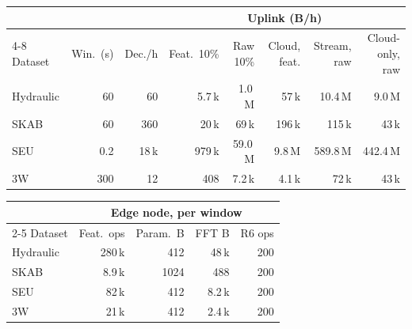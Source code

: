 \begin{tabular}{@{}l rr rrrrr@{}}
\toprule
& & & \multicolumn{5}{c}{Uplink (B/h)} \\
\cmidrule(l){4-8}
Dataset & Win.\ (s) & Dec./h & Feat.\ 10\% & Raw 10\% & Cloud, feat. & Stream, raw & Cloud-only, raw \\
\midrule
Hydraulic & 60 & 60 & 5.7\,k & 1.0\,M & 57\,k & 10.4\,M & 9.0\,M \\
SKAB & 60 & 360 & 20\,k & 69\,k & 196\,k & 115\,k & 43\,k \\
SEU & 0.2 & 18\,k & 979\,k & 59.0\,M & 9.8\,M & 589.8\,M & 442.4\,M \\
3W & 300 & 12 & 408 & 7.2\,k & 4.1\,k & 72\,k & 43\,k \\
\bottomrule
\end{tabular}
\par\medskip
\begin{tabular}{@{}l rrrr@{}}
\toprule
& \multicolumn{4}{c}{Edge node, per window} \\
\cmidrule(l){2-5}
Dataset & Feat.\ ops & Param.\ B & FFT B & R6 ops \\
\midrule
Hydraulic & 280\,k & 412 & 48\,k & 200 \\
SKAB & 8.9\,k & 1024 & 488 & 200 \\
SEU & 82\,k & 412 & 8.2\,k & 200 \\
3W & 21\,k & 412 & 2.4\,k & 200 \\
\bottomrule
\end{tabular}
